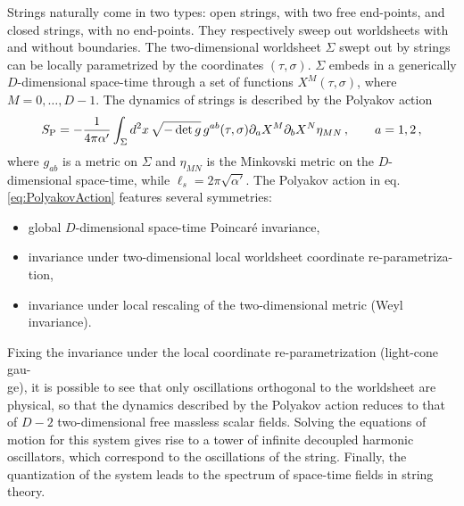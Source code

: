\documentclass[12pt,a4paper]{book}
\newcommand{\bi}{\begin{itemize}}
\newcommand{\ei}{\end{itemize}}
\begin{document}
Strings naturally come in two types: open strings, with two free end-points, and closed strings, with no end-points. They respectively sweep out worldsheets with and without boundaries. The two-dimensional worldsheet $\Sigma$ swept out by strings can be locally parametrized by the coordinates $(\tau, \sigma)$. $\Sigma$ embeds in a generically $D$-dimensional space-time through a set of functions $X^M(\tau, \sigma)$, where $M = 0, \dots, D-1$. The dynamics of strings is described by the Polyakov action~\cite{Polchinski:1998rq, Green:1987sp}
\begin{align}
\label{eq:PolyakovAction}
S_{\rm P} = -\frac{1}{4 \pi \alpha'} \int_\Sigma d^2x \, \sqrt{- \det{g}}\, g^{ab}(\tau, \sigma) \partial_a X^M \partial_b X^N \eta_{MN} \,, \qquad a = 1,2 \,,
\end{align}
where $g_{ab}$ is a metric on $\Sigma$ and $\eta_{MN}$ is the Minkovski metric on the $D$-dimensional space-time, while $\ell_s = 2 \pi \sqrt{\alpha'}$. The Polyakov action in eq. \eqref{eq:PolyakovAction} features several symmetries:
\bi
\item global $D$-dimensional space-time Poincar\'e invariance,
\item invariance under two-dimensional local worldsheet coordinate re-parametriza-\\tion,
\item invariance under local rescaling of the two-dimensional metric (Weyl invariance).
\ei
Fixing the invariance under the local coordinate re-parametrization (light-cone gau-\\ge), it is possible to see that only oscillations orthogonal to the worldsheet are physical, so that the dynamics described by the Polyakov action reduces to that of $D-2$ two-dimensional free massless scalar fields. Solving the equations of motion for this system gives rise to a tower of infinite decoupled harmonic oscillators, which correspond to the oscillations of the string. Finally, the quantization of the system leads to the spectrum of space-time fields in string theory.\\
\end{document}
